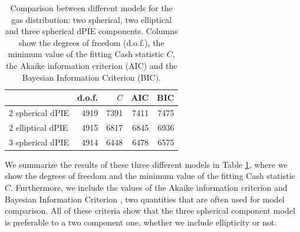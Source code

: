 \documentclass[twocolumn]{aastex61}
\begin{document}
\begin{table}
\centering
\begin{tabular}{lrrrr}

\hline
\hline
	                & d.o.f.  & $C$     & AIC   & BIC  \\
\hline
2 spherical dPIE    & 4919    & 7391   & 7411  & 7475 \\
2 elliptical dPIE   & 4915    & 6817   & 6845  & 6936 \\
3 spherical dPIE    & 4914    & 6448   & 6478  & 6575 \\
\hline

\end{tabular}
\caption{Comparison between different models for the gas distribution: two spherical,
two elliptical and three spherical dPIE components. Columns show the degrees of
freedom (d.o.f.), the minimum value of the fitting Cash statistic $C$, the Akaike
information criterion (AIC) and the Bayesian Information Criterion (BIC).\label{tab:chis}}
\end{table}
We summarize the results of these three different models in Table \ref{tab:chis}, where
we show the degrees of freedom and the minimum value of the fitting Cash statistic $C$.
Furthermore, we include the values of the Akaike information criterion \citep[AIC,][]{Akaike1974} and
Bayesian Information Criterion \citep[BIC,][]{Schwarz1978}, two quantities that are often used for model comparison.
All of these criteria show that the three spherical component model is
preferable to a two component one, whether we include ellipticity or not.
\end{document}

